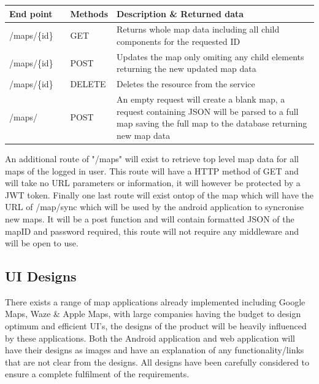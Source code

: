 \begin{longtable}{| p{0.2\linewidth} | p{0.1\linewidth} | p{0.7\linewidth}|}
	\hline
	End point & Methods & Description \& Returned data\\\hline
	/maps/\{id\} & GET & Returns whole map data including all child components for the requested ID\\\hline
	/maps/\{id\} & POST & Updates the map only omiting any child elements  returning the new updated map data\\\hline
	/maps/\{id\} & DELETE & Deletes the resource from the service\\\hline
	/maps/ & POST & An empty request will create a blank map, a request containing JSON will be parsed to a full map saving the full map to the database returning new map data\\\hline
	
\end{longtable}

An additional route of "/maps" will exist to retrieve top level map data for all maps of the logged in user. This route will have a HTTP method of GET and will take no URL parameters or information, it will however be protected by a JWT token.
Finally one last route will exist ontop of the map which will have the URL of /map/sync which will be used by the android application to syncronise new maps. It will be a post function and will contain formatted JSON of the mapID and password required, this route will not require any middleware and will be open to use.

\subsection{UI Designs}
There exists a range of map applications already implemented including Google Maps, Waze \& Apple Maps, with large companies having the budget to design optimum and efficient UI's, the designs of the product will be heavily influenced by these applications. Both the Android application and web application will have their designs as images and have an explanation of any functionality/links that are not clear from the designs. All designs have been carefully considered to ensure a complete fulfilment of the requirements.

\pagebreak
